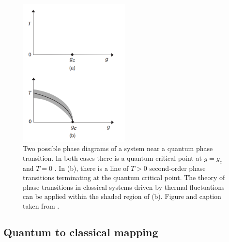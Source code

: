 \begin{figure}
    \center
    \includegraphics[width=0.5\textwidth]{Figuren/crit/Screenshot from 2021-05-06 15-58-55.png}
    \caption{ Two possible phase diagrams of a system near a quantum phase transition. In both cases there is a quantum critical point at $g = g_c$ and $T = 0$ . In (b), there is a line of $T > 0$ second-order phase transitions terminating at the quantum critical point. The theory of phase transitions in classical systems driven by thermal fluctuations can be applied within the shaded region of (b).  Figure and caption taken from \cite{Sachdev1999}. }
    \label{fig:crit:qtran}
\end{figure}

\subsection{Quantum to classical mapping}

